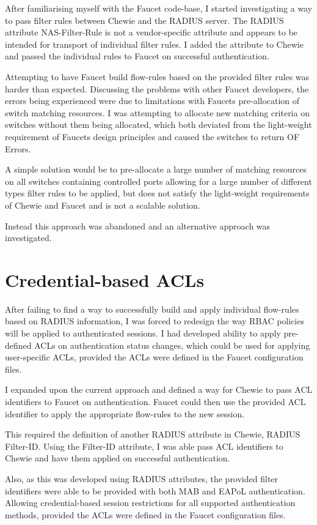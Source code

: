 After familiarising myself with the Faucet code-base, I started investigating a way to pass filter rules between Chewie and the RADIUS server. The RADIUS attribute NAS-Filter-Rule \cite{radius_nas_filter_rule} is not a vendor-specific attribute and appears to be intended for transport of individual filter rules. I added the attribute to Chewie and passed the individual rules to Faucet on successful authentication.

Attempting to have Faucet build flow-rules based on the provided filter rules was harder than expected. Discussing the problems with other Faucet developers, the errors being experienced were due to limitations with Faucets pre-allocation of switch matching resources. I was attempting to allocate new matching criteria on switches without them being allocated, which both deviated from the light-weight requirement of Faucets design principles and caused the switches to return OF Errors.

A simple solution would be to pre-allocate a large number of matching resources on all switches containing controlled ports allowing for a large number of different types filter rules to be applied, but does not satisfy the light-weight requirements of Chewie and Faucet and is not a scalable solution.

Instead this approach was abandoned and an alternative approach was investigated.

\section{Credential-based ACLs}
After failing to find a way to successfully build and apply individual flow-rules based on RADIUS information, I was forced to redesign the way RBAC policies will be applied to authenticated sessions. 
I had developed ability to apply pre-defined ACLs on authentication status changes, which could be used for applying user-specific ACLs, provided the ACLs were defined in the Faucet configuration files. 

I expanded upon the current approach and defined a way for Chewie to pass ACL identifiers to Faucet on authentication. Faucet could then use the provided ACL identifier to apply the appropriate flow-rules to the new session.

This required the definition of another RADIUS attribute in Chewie, RADIUS Filter-ID. Using the Filter-ID attribute, I was able pass ACL identifiers to Chewie and have them applied on successful authentication.

Also, as this was developed using RADIUS attributes, the provided filter identifiers were able to be provided with both MAB and EAPoL authentication. Allowing credential-based session restrictions for all supported authentication methods, provided the ACLs were defined in the Faucet configuration files.
